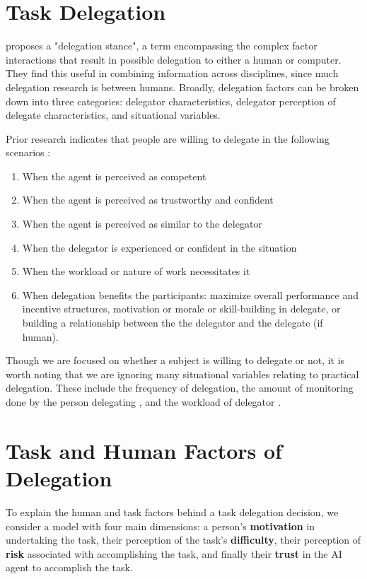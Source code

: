 \documentclass[letterpaper]{article} %
\begin{document}
\section{Task Delegation}

\cite{milewski1} proposes a "delegation stance", a term encompassing the complex factor interactions that result in possible delegation to either a human or computer. They find this useful in combining information across disciplines, since much delegation research is between humans. Broadly, delegation factors can be broken down into three categories: delegator characteristics, delegator perception of delegate characteristics, and situational variables.

Prior research indicates that people are willing to delegate in the following scenarios \cite{milewski1}: 
\begin{enumerate}
    \item When the agent is perceived as competent
    \item When the agent is perceived as trustworthy and confident
    \item When the agent is perceived as similar to the delegator
    \item When the delegator is experienced or confident in the situation
    \item When the workload or nature of work necessitates it
    \item When delegation benefits the participants: maximize overall performance and incentive structures, motivation or morale or skill-building in delegate, or building a relationship between the the delegator and the delegate (if human).
\end{enumerate}

Though we are focused on whether a subject is willing to delegate or not, it is worth noting that we are ignoring many situational variables relating to practical delegation. These include the frequency of delegation, the amount of monitoring done by the person delegating \cite{milewski1}, and the workload of delegator \cite{leana1986predictors}.

\section{Task and Human Factors of Delegation}
To explain the human and task factors behind a task delegation decision, we consider a model with four main dimensions: a person's \textbf{motivation} in undertaking the task, their perception of the task's \textbf{difficulty}, their perception of \textbf{risk} associated with accomplishing the task, and finally their \textbf{trust} in the AI agent to accomplish the task.
\end{document}
